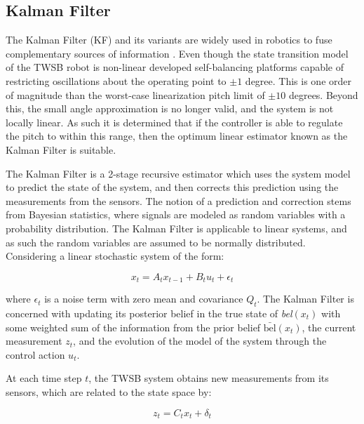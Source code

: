         \subsection{Kalman Filter}
        The Kalman Filter (KF) and its variants  are widely used in robotics to fuse 
        complementary sources of information \cite{Thrun2005ProbabilisticRobotics} \cite{perez2023quadcopter} \cite{Moore2014AGE}.
        Even though the state transition model of the TWSB robot is non-linear \cite{ooi2003balancing} 
        developed self-balancing platforms capable of restricting oscillations about the 
        operating point to $±1$ degree. This is one order of magnitude than the worst-case linearization pitch limit of $±10$ degrees.
        Beyond this, the small angle approximation is no longer valid, and the system is not locally linear. As such it is determined 
        that if the controller is able to regulate the pitch to within this range, then the optimum linear estimator known as the Kalman Filter is suitable.

        The Kalman Filter is a 2-stage recursive estimator which uses the system model to predict the state of the system,
        and then corrects this prediction using the measurements from the sensors. The notion of a prediction and correction 
        stems from Bayesian statistics, where signals are modeled as random variables with a probability distribution.
        The Kalman Filter is applicable to linear systems, and as such the random variables are assumed to be normally distributed. 
        Considering a linear stochastic system of the form:

        \begin{equation}
            x_t = A_t x_{t-1} + B_t u_t + \epsilon_t
        \end{equation}

        where $\epsilon_t$ is a noise term with zero mean and covariance $Q_t$. The Kalman Filter is concerned with 
        updating its posterior belief in the true state of \textit{bel}$(x_t)$ with some weighted sum of the 
        information from the prior belief \textit{$\bar{\text{bel}}(x_t)$}, the current measurement $z_t$, and the evolution of 
        the model of the system through the control action $u_t$.

        At each time step $t$, the TWSB system obtains new measurements from its sensors, which are related to the state space by:

        \begin{equation}
            z_t = C_t x_t + \delta_t
        \end{equation}

